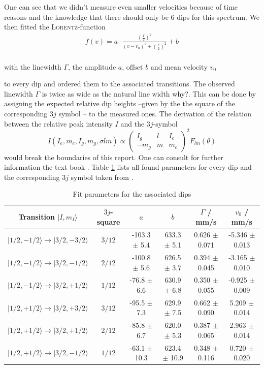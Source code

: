 \documentclass[11pt,a4paper,notitlepage]{scrartcl}
\begin{document}
One can see that we didn't measure even smaller velocities because of time reasons and the knowledge that there should only be 6 dips for this spectrum. We then fitted the \textsc{Lorentz}-function \cite{demtröder}
\begin{align*}
	f(v)=a\cdot\frac{(\frac{\Gamma}{2})^2}{(v-v_0)^2+(\frac{\Gamma}{2})^2}+b \\
\end{align*}
\begin{center}
	\vspace{-0.8cm}
	$	\text{with the linewidth } \Gamma\text{, the amplitude } a\text{, offset } b\text{ and mean velocity } v_0$
\end{center}
to every dip and ordered them to the associated transitions. The observed linewidth $\Gamma$ is twice as wide as the natural line width \cite{chemistry} \color{red}why?\color{black}. This can be done by assigning the expected relative dip heights --given by the the square of the corresponding $3j$ symbol \cite{chemistry}-- to the measured ones. The derivation of the relation between the relative peak intensity $I$ and the $3j$-symbol $$I(I_e,m_e,I_g,m_g,\sigma lm)\propto\begin{pmatrix}I_g&l&I_e\\-m_g&m&m_e
\end{pmatrix}^2F_{lm}(\theta)$$ would break the boundaries of this report. One can consult for further information the text book \cite{chemistry}. Table \ref{tab:dips} lists all found parameters for every dip and the corresponding $3j$ symbol taken from \cite{chemistry}.

\begin{table}
	\centering
	\begin{tabular}{c|c|c|c|c|c}
	
		Transition $|I,m_I \rangle$ &$3j$-square& $a$&$b$ &$\Gamma$ / mm/s&$v_0$ / mm/s \\
		\hline
		$|1/2,-1/2\rangle \to |3/2,-3/2\rangle$&${3/12}$& -103.3 $\pm$ 5.4 & 633.3 $\pm$ 5.1 & 0.626 $\pm$ 0.071 & -5.346 $\pm$ 0.013\\
		$|1/2,-1/2\rangle\rightarrow |3/2,-1/2\rangle$&${2/12}$& -100.8 $\pm$ 5.6 & 626.5 $\pm$ 3.7 & 0.394 $\pm$ 0.045 & -3.165 $\pm$ 0.010\\
		$|1/2,-1/2\rangle\rightarrow |3/2,+1/2\rangle$&${1/12}$& -76.8 $\pm$ 6.6 & 630.9 $\pm$ 6.8 & 0.350 $\pm$ 0.055 & -0.925 $\pm$ 0.009\\
		$|1/2,+1/2\rangle\rightarrow |3/2,+3/2\rangle$&${3/12}$& -95.5 $\pm$ 7.3 & 629.9 $\pm$ 7.5 & 0.662 $\pm$ 0.090 & 5.209 $\pm$ 0.014\\
		$|1/2,+1/2\rangle\rightarrow |3/2,+1/2\rangle$&${2/12}$& -85.8 $\pm$ 6.7 & 620.0 $\pm$ 5.3 & 0.387 $\pm$ 0.065 & 2.963 $\pm$ 0.014\\
		$|1/2,+1/2\rangle\rightarrow |3/2,-1/2\rangle$&${1/12}$ & -63.1 $\pm$ 10.3& 623.4 $\pm$ 10.9 & 0.348 $\pm$ 0.116 & 0.720 $\pm$ 0.020\\
		\hline
	\end{tabular}
	\caption{Fit parameters for the associated dips}\label{tab:dips}
\end{table}
\end{document}

